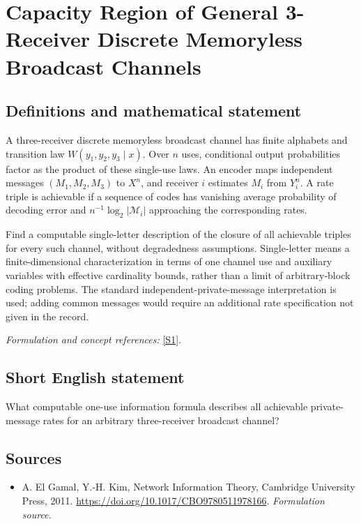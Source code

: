 \documentclass[11pt]{article}
\begin{document}
\section*{\texorpdfstring{Capacity Region of General 3-Receiver Discrete Memoryless Broadcast Channels}{Capacity Region of General 3-Receiver Discrete Memoryless Broadcast Channels}}\label{458}
\subsection{Definitions and mathematical statement}
A three-receiver discrete memoryless broadcast channel has finite alphabets and transition law $W(y_1,y_2,y_3\mid x)$. Over $n$ uses, conditional output probabilities factor as the product of these single-use laws. An encoder maps independent messages $(M_1,M_2,M_3)$ to $X^n$, and receiver $i$ estimates $M_i$ from $Y_i^n$. A rate triple is achievable if a sequence of codes has vanishing average probability of decoding error and $n^{-1}\log_2|\mathcal M_i|$ approaching the corresponding rates.

Find a computable single-letter description of the closure of all achievable triples for every such channel, without degradedness assumptions. Single-letter means a finite-dimensional characterization in terms of one channel use and auxiliary variables with effective cardinality bounds, rather than a limit of arbitrary-block coding problems. The standard independent-private-message interpretation is used; adding common messages would require an additional rate specification not given in the record.
\par\smallskip\textit{Formulation and concept references:} \href{https://doi.org/10.1017/CBO9780511978166}{[S1]}.

\subsection{Short English statement}
What computable one-use information formula describes all achievable private-message rates for an arbitrary three-receiver broadcast channel?
\subsection{Sources}
\begin{itemize}
\item[S1]A. El Gamal, Y.-H. Kim, Network Information Theory, Cambridge University Press, 2011.
\url{https://doi.org/10.1017/CBO9780511978166}.
\textit{Formulation source.}
\end{itemize}
\end{document}
